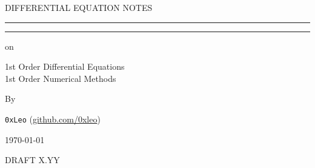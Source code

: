 \begin{titlepage}
	\vspace{0.75\baselineskip} %
	
	{\LARGE DIFFERENTIAL EQUATION NOTES\\} %
	
	\vspace{0.75\baselineskip} %
	
	\rule{\textwidth}{0.4pt}\vspace*{-\baselineskip}\vspace{3.2pt} %
	\rule{\textwidth}{1.6pt} %
	
	\vspace{2\baselineskip} %
	
	 on
	
	\vspace*{3\baselineskip} %
	
	1st Order Differential Equations\\
	1st Order Numerical Methods
	
	\vspace*{3\baselineskip} %
	
	
	By
	
	\vspace{0.5\baselineskip} %
	
	{\normalfont \Large \texttt{0xLeo} (\url{github.com/0xleo}) \\} %
	
	\vspace{0.5\baselineskip} %
	
	
	\vfill %
	
	
	
	\vspace{0.3\baselineskip} %
	
	\today %
	
	{DRAFT X.YY} %

\end{titlepage}

